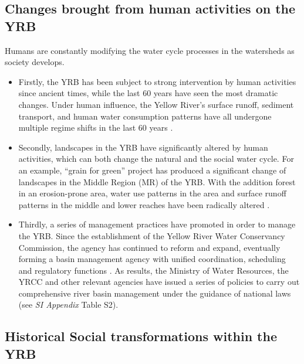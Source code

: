 \documentclass[9pt,twoside,lineno]{pnas-new}
\begin{document}
\subsection*{Changes brought from human activities on the YRB}
Humans are constantly modifying the water cycle processes in the watersheds as society develops.
\begin{itemize}
    \item Firstly, the YRB has been subject to strong intervention by human activities since ancient times, while the last 60 years have seen the most dramatic changes. Under human influence, the Yellow River's surface runoff, sediment transport, and human water consumption patterns have all undergone multiple regime shifts in the last 60 years
    \cite{wu2020,wangReducedsedimenttransport2016}.
    \item Secondly, landscapes in the YRB have significantly altered by human activities, which can both change the natural and the social water cycle. For an example, ``grain for green'' project has produced a significant change of landscapes in the Middle Region (MR) of the YRB. With the addition forest in an erosion-prone area, water use patterns in the area and surface runoff patterns in the middle and lower reaches have been radically altered 
    \cite{wu2020}.
    \item Thirdly, a series of management practices have promoted in order to manage the YRB. Since the establishment of the Yellow River Water Conservancy Commission, the agency has continued to reform and expand, eventually forming a basin management agency with unified coordination, scheduling and regulatory functions \cite{yellowriverconservancycommissionYellowRiverBasin2013}. 
    As results, the Ministry of Water Resources, the YRCC and other relevant agencies have issued a series of policies to carry out comprehensive river basin management under the guidance of national laws (see \textit{SI Appendix} Table S2).
\end{itemize}

\subsection*{Historical Social transformations within the YRB}
\end{document}
